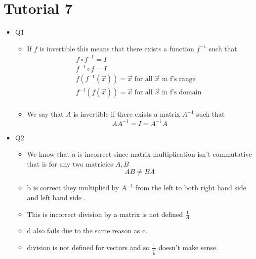 \documentclass[11pt]{book}
\begin{document}

\section*{Tutorial 7}%
\label{sec:tutorial_7}

\begin{itemize}
    \item Q1
        \begin{itemize}
            \item If $f$ is invertible this means that there exists a function $f^{-1} $ such that 
            \begin{gather*}
                f \circ f^{-1} = I\\
                f^{-1}  \circ f = I\\
                f\left(f^{-1} \left(\vec{x} \right)\right)= \vec{x} \text{ for all  } \vec{x} \text{ in f's range } \\
                f^{-1} \left(f\left(\vec{x} \right)\right)= \vec{x} \text{ for all  } \vec{x} \text{ in f's domain }\\
            \end{gather*}
            \item We say that $A$ is invertible if there exists a matrix $A^{-1} $ such that 
            \begin{equation*}
                A A^{-1} = I= A^{-1} A
            \end{equation*}
        \end{itemize}
    \item Q2
        \begin{itemize}
            \item We know that a is incorrect since matrix multiplication isn't commutative that is for any two matricies $A, B$ 
            \begin{equation*}
                AB \neq BA      
            \end{equation*}
            \item b is correct they multiplied by $A^{-1} $ from the left to both right hand side and left hand side .
            \item This is incorrect division by a matrix is not defined $\frac{1}{A}$ 
            \item d also fails due to the same reason as c.
            \item division is not defined for vectors and so $\frac{1}{\vec{b} }$ doesn't make sense.

\end{itemize}
\end{itemize}
\end{document}

